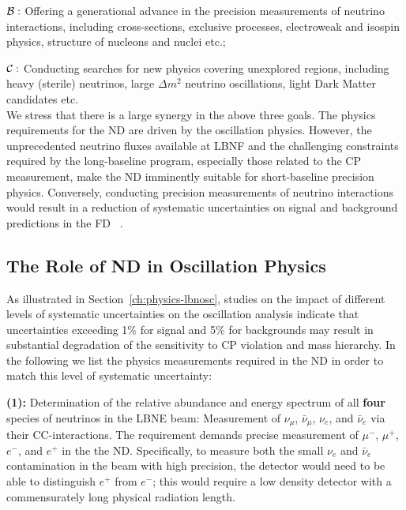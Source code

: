 \noindent
{\boldmath $ {\cal B:}$} Offering a generational advance in the precision measurements of neutrino interactions, including 
cross-sections, exclusive processes, electroweak and isospin physics, structure of nucleons and nuclei etc.;  

\noindent
{\boldmath $ {\cal C:}$} Conducting searches for new physics covering unexplored regions, 
including heavy (sterile) neutrinos, large $\Delta m^2$ neutrino oscillations, light Dark Matter 
candidates etc. \\
\noindent
We stress that there is a large synergy in the above three goals. The physics requirements for the ND are driven 
by the oscillation physics. However,  the unprecedented neutrino fluxes available at LBNF and the challenging 
constraints required by the long-baseline program, especially those related to the CP measurement,   make the ND imminently suitable for  short-baseline 
precision physics. Conversely, conducting precision measurements of neutrino 
interactions would result in a reduction of systematic uncertainties on signal and background 
predictions in the FD ~\cite{DPR, LBNE-SCI}. 



\subsection{The Role of ND in Oscillation Physics}  
\label{sec-nd-oscl} 

As illustrated in Section~\ref{ch:physics-lbnosc}, studies on the impact of different levels of systematic 
uncertainties on the oscillation analysis indicate 
that uncertainties exceeding 1\% for signal and 5\% for backgrounds may result in 
substantial degradation of the sensitivity to CP violation and mass hierarchy. 
In the following we list the physics measurements required in the ND in order to 
match this level of systematic uncertainty:   

\vspace{0.25cm} 
\noindent
{\bf (1):}  Determination of the relative abundance and 
energy spectrum of all  {\bf four} species of neutrinos in the LBNE beam: Measurement of 
$\nu_\mu$, $\bar \nu_\mu$, $\nu_e$, and $\bar \nu_e$ via their  CC-interactions.  
The requirement demands precise measurement of $\mu^-$, $\mu^+$, $e^-$, and $e^+$ in the 
the ND. Specifically, to measure both the small $\nu_e$ and $\bar \nu_e$ contamination in the beam with high precision, 
the detector would need to be able to distinguish $e^+$  from $e^-$; 
this would require a low density detector with a commensurately long physical radiation length. 


